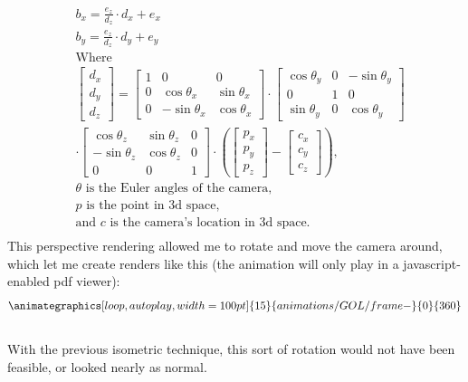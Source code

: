 \documentclass[12pt]{article}
\begin{document}
	\begin{align*}
		&b_x=\frac{e_z}{d_z}\cdot d_x+e_x\\
		&b_y=\frac{e_z}{d_z}\cdot d_y+e_y\\
		&\text{Where}\\
		&\begin{bmatrix}d_x\\d_y\\d_z\end{bmatrix}=\begin{bmatrix}1&0&0\\0&\cos\theta_x&\sin\theta_x\\0&-\sin\theta_x&\cos\theta_x\end{bmatrix}
		\cdot
		\begin{bmatrix}\cos\theta_y&0&-\sin\theta_y\\0&1&0\\\sin\theta_y&0&\cos\theta_y\end{bmatrix}
		\\&\cdot
		\begin{bmatrix}\cos\theta_z&\sin\theta_z&0\\-\sin\theta_z&\cos\theta_z&0\\0&0&1\end{bmatrix}
		\cdot\left(\begin{bmatrix}p_x\\p_y\\p_z\end{bmatrix}-\begin{bmatrix}c_x\\c_y\\c_z\end{bmatrix}\right),\\
		&\theta\text{ is the Euler angles of the camera,}\\
		&p\text{ is the point in 3d space,}\\
		&\text{and }c\text{ is the camera's location in 3d space.}
		\\
	\end{align*}
	This perspective rendering allowed me to rotate and move the camera around, which let me create renders like this (the animation will only play in a javascript-enabled pdf viewer):\\
	\begin{align*}\animategraphics[loop,autoplay,width=100pt]{15}{animations/GOL/frame-}{0}{360}\end{align*}\\
	With the previous isometric technique, this sort of rotation would not have been feasible, or looked nearly as normal.
\end{document}
